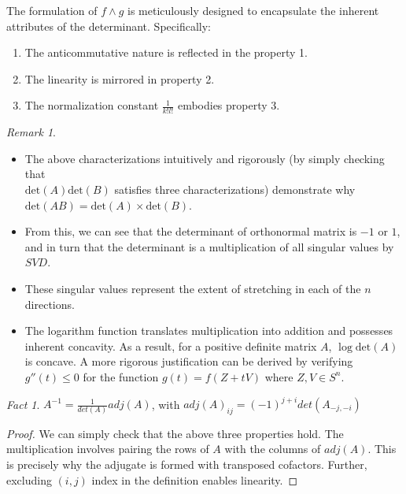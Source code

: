 \documentclass[11pt,reqno]{amsart}
\theoremstyle{remark}
\newtheorem{remark}[example]{Remark}
\newtheorem{fact}{Fact}
\begin{document}
  The formulation of $f\wedge g$ is meticulously designed to 
  encapsulate the inherent attributes of the determinant. Specifically:
  \begin{enumerate}
    \item The anticommutative nature is reflected in the property 1.
    \item The linearity is mirrored in property 2.
    \item The normalization constant $\frac{1}{k!l!}$ embodies property 3.
  \end{enumerate}
\begin{remark}
\begin{itemize}
 \item The above characterizations intuitively and rigorously (by simply checking that\\
  $\text{det}(A)\text{det}(B)$ satisfies three characterizations) demonstrate why\\
   $ \text{det}(AB) = \text{det}(A) \times \text{det}(B) $.
 \item From this, we can see that the determinant of orthonormal matrix is $-1$ or $1$, and in turn that the determinant is a multiplication of all singular values by $SVD$.
 \item These singular values represent the extent of stretching in each of the \( n \) directions.
 \item The logarithm function translates multiplication into addition and possesses inherent concavity. As a result, for a positive definite matrix \( A \), \( \log \text{det}(A) \) is concave. A more rigorous justification can be derived by verifying \( g''(t) \leq 0 \) for 
 the function \( g(t) = f(Z + tV) \) where \( Z, V \in S^n \).
\end{itemize}
\begin{fact}
$A^{-1}=\frac{1}{det(A)}adj(A)$, with $adj(A)_{ij}=(-1)^{j+i}det(A_{-j,-i})$
\end{fact}
\begin{proof}
We can simply check that the above three properties hold. The multiplication involves
pairing the rows of $A$ with the columns of $adj(A)$. This is precisely why the adjugate is
formed with transposed cofactors. Further, excluding $(i,j)$ index in the definition enables linearity.
\end{proof}
\end{remark}
\end{document}
